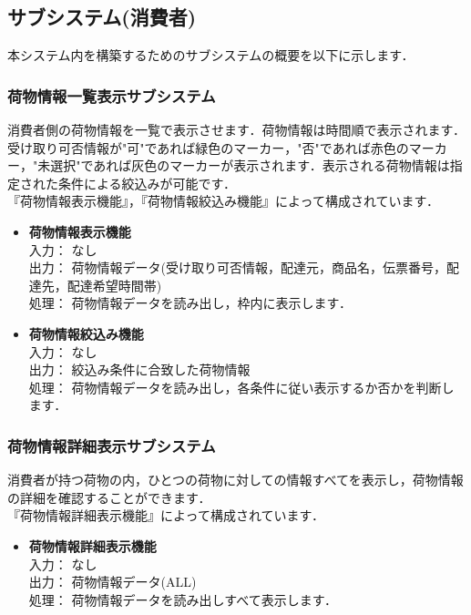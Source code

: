 \documentclass[a4j,titlepage]{jarticle}
\begin{document}
\subsection{サブシステム(消費者)}
本システム内を構築するためのサブシステムの概要を以下に示します．

\subsubsection{荷物情報一覧表示サブシステム}
消費者側の荷物情報を一覧で表示させます．荷物情報は時間順で表示されます．受け取り可否情報が"可"であれば緑色のマーカー，"否"であれば赤色のマーカー，"未選択"であれば灰色のマーカーが表示されます．表示される荷物情報は指定された条件による絞込みが可能です．\\
『荷物情報表示機能』，『荷物情報絞込み機能』によって構成されています．
\begin{itemize}
\item \textbf{荷物情報表示機能} \\
入力： なし \\
出力： 荷物情報データ(受け取り可否情報，配達元，商品名，伝票番号，配達先，配達希望時間帯)  \\
処理： 荷物情報データを読み出し，枠内に表示します．
\item \textbf{荷物情報絞込み機能} \\
入力： なし \\
出力： 絞込み条件に合致した荷物情報 \\
処理： 荷物情報データを読み出し，各条件に従い表示するか否かを判断します．
\end{itemize}

\subsubsection{荷物情報詳細表示サブシステム}
消費者が持つ荷物の内，ひとつの荷物に対しての情報すべてを表示し，荷物情報の詳細を確認することができます．\\
『荷物情報詳細表示機能』によって構成されています．
\begin{itemize}
\item \textbf{荷物情報詳細表示機能} \\
入力： なし \\
出力： 荷物情報データ(ALL) \\
処理： 荷物情報データを読み出しすべて表示します．
\end{itemize}
\end{document}
